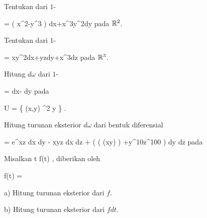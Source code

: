 \setcounter{section}{20}


{}
{

Tentukan
dari
$1$-

\mavergleichskettedisp
{\vergleichskette
{ \omega
}
{ =} { \left(  x^2-y^3  \right) dx+x^3y^2dy
}
{ } {
}
{ } {
}
{ } {
}
}
{}{}{}
pada ${\mathbb R}^2$.

}
{} {}

{}
{

Tentukan
dari
$1$-

\mavergleichskettedisp
{\vergleichskette
{ \omega
}
{ =} { xy^2dx+yzdy+x^3dz
}
{ } {
}
{ } {
}
{ } {
}
}
{}{}{}
pada ${\mathbb R}^3$.

}
{} {}

{}
{

Hitung
$d \omega$ dari
$1$-

\mavergleichskettedisp
{\vergleichskette
{ \omega
}
{ =} { {  } dx- {  } dy
}
{ } {
}
{ } {
}
{ } {
}
}
{}{}{}
pada

\mavergleichskette
{\vergleichskette
{ U
}
{ = }{ \left\{ (x,y) \in \R^2  \mid   y          \right\}
}
{  }{
}
{    }{
}
{   }{
}
}
{}{}{.}

}
{} {}

{}
{

Hitung turunan eksterior $d \omega$ dari bentuk diferensial

\mavergleichskettedisp
{\vergleichskette
{ \omega
}
{ =} {  e^{xz} dx \wedge dy - xyz dx \wedge dz + \left(  \sin ( \cos (xy) )  +y^{10}z^{100}  \right) dy \wedge dz
}
{ } {
}
{ } {
}
{ } {
}
}
{}{}{}
pada

}
{} {}

{}
{

Misalkan
 {\R} {\R
} { t } {f(t)
} {,}
diberikan oleh

\mavergleichskettedisp
{\vergleichskette
{ f(t)
}
{ =} { {  }
}
{ } {
}
{ } {
}
{ } {
}
}
{}{}{}

a) Hitung turunan eksterior dari $f$.

b) Hitung turunan eksterior dari $fdt$.

}
{} {}

